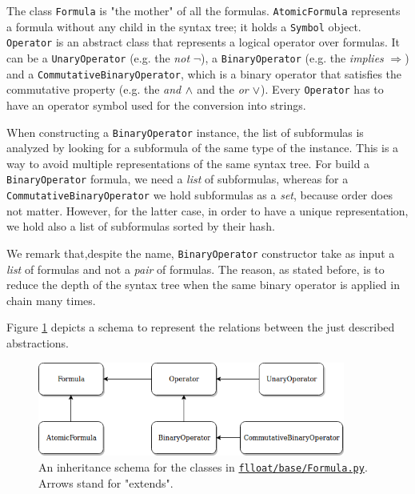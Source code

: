 The class \texttt{Formula} is "the mother" of all the formulas. \texttt{AtomicFormula} represents a formula without any child in the syntax tree; it holds a \texttt{Symbol} object. \texttt{Operator} is an abstract class that represents a logical operator over formulas. It can be a \texttt{UnaryOperator} (e.g. the \emph{not} $\lnot$), a \texttt{BinaryOperator} (e.g. the \emph{implies} $\Rightarrow$) and a \texttt{CommutativeBinaryOperator}, which is a binary operator that satisfies the commutative property (e.g. the \emph{and} $\wedge$ and the \emph{or} $\vee$). Every \texttt{Operator} has to have an operator symbol used for the conversion into strings. 

When constructing a \texttt{BinaryOperator} instance, the list of subformulas is analyzed by looking for a subformula of the same type of the instance. This is a way to avoid multiple representations of the same syntax tree. For build a \texttt{BinaryOperator} formula, we need a \emph{list} of subformulas, whereas for a \texttt{CommutativeBinaryOperator} we hold subformulas as a \emph{set}, because order does not matter. However, for the latter case, in order to have a unique representation, we hold also a list of subformulas sorted by their hash.

We remark that,despite the name, \texttt{BinaryOperator} constructor take as input a \emph{list} of formulas and not a \emph{pair} of formulas. The reason, as stated before, is to reduce the depth of the syntax tree when the same binary operator is applied in chain many times.

Figure \ref{fig:formula-diagram} depicts a schema to represent the relations between the just described abstractions.

\begin{figure}
	\centering
	\includegraphics[width=0.9\textwidth]{images/formula-diagram}
	\caption{An inheritance schema for the classes in \href{https://github.com/MarcoFavorito/flloat/blob/0.1.4/flloat/base/Formula.py}{\texttt{flloat/base/Formula.py}}. Arrows stand for "extends".}
	\label{fig:formula-diagram}
\end{figure}

